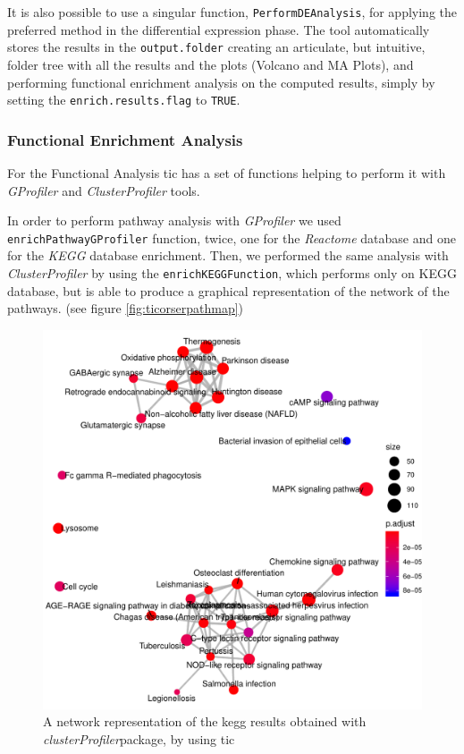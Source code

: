 It is also possible to use a singular function, \lstinline!PerformDEAnalysis!, for applying the preferred method in the differential expression phase. 
The tool automatically stores the results in the \lstinline!output.folder! creating an articulate, but intuitive, folder tree with all the results and the plots (Volcano and MA Plots), and performing functional enrichment analysis on the computed results, simply by setting the \lstinline!enrich.results.flag! to \lstinline!TRUE!.

\subsubsection{Functional Enrichment Analysis}

For the Functional Analysis \gls{tic} has a set of functions helping to perform it with \textit{GProfiler} and \textit{ClusterProfiler} tools.

In order to perform pathway analysis with \textit{GProfiler} we used \lstinline!enrichPathwayGProfiler! function, twice, one for the \textit{Reactome} database and one for the \textit{KEGG} database enrichment.
Then, we performed the same analysis with \textit{ClusterProfiler} by using the \lstinline!enrichKEGGFunction!, which performs only on KEGG database, but is able to produce a graphical representation of the network of the pathways. (see figure \ref{fig:ticorserpathmap})

\begin{figure}[H]
\centering
\includegraphics[width=\textwidth, keepaspectratio]{img/ticorser/functional/net_kegg.pdf}
\caption[ticorser pathway network]{A network representation of the kegg results obtained with \textit{clusterProfiler}package, by using \gls{tic}}
\label{fig:ticorserpathmat}
\end{figure}

